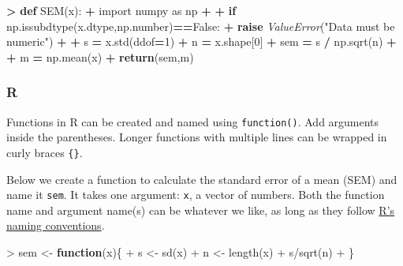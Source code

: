 \documentclass[
]{book}
\newenvironment{Shaded}{\begin{snugshade}}{\end{snugshade}}
\newcommand{\ControlFlowTok}[1]{\textcolor[rgb]{0.13,0.29,0.53}{\textbf{#1}}}
\newcommand{\DecValTok}[1]{\textcolor[rgb]{0.00,0.00,0.81}{#1}}
\newcommand{\FunctionTok}[1]{\textcolor[rgb]{0.00,0.00,0.00}{#1}}
\newcommand{\ImportTok}[1]{#1}
\newcommand{\KeywordTok}[1]{\textcolor[rgb]{0.13,0.29,0.53}{\textbf{#1}}}
\newcommand{\NormalTok}[1]{#1}
\newcommand{\OperatorTok}[1]{\textcolor[rgb]{0.81,0.36,0.00}{\textbf{#1}}}
\newcommand{\OtherTok}[1]{\textcolor[rgb]{0.56,0.35,0.01}{#1}}
\newcommand{\PreprocessorTok}[1]{\textcolor[rgb]{0.56,0.35,0.01}{\textit{#1}}}
\newcommand{\SpecialCharTok}[1]{\textcolor[rgb]{0.00,0.00,0.00}{#1}}
\newcommand{\StringTok}[1]{\textcolor[rgb]{0.31,0.60,0.02}{#1}}
\newcommand{\VariableTok}[1]{\textcolor[rgb]{0.00,0.00,0.00}{#1}}
\begin{document}
\begin{Shaded}
\begin{Highlighting}[]
\OperatorTok{\textgreater{}} \KeywordTok{def}\NormalTok{ SEM(x):}
\OperatorTok{+}   \ImportTok{import}\NormalTok{ numpy }\ImportTok{as}\NormalTok{ np}
\OperatorTok{+}   
\OperatorTok{+}   \ControlFlowTok{if}\NormalTok{ np.issubdtype(x.dtype,np.number)}\OperatorTok{==}\VariableTok{False}\NormalTok{:}
\OperatorTok{+}     \ControlFlowTok{raise} \PreprocessorTok{ValueError}\NormalTok{(}\StringTok{"Data must be numeric"}\NormalTok{)}
\OperatorTok{+}   
\OperatorTok{+}\NormalTok{   s }\OperatorTok{=}\NormalTok{ x.std(ddof}\OperatorTok{=}\DecValTok{1}\NormalTok{) }
\OperatorTok{+}\NormalTok{   n }\OperatorTok{=}\NormalTok{ x.shape[}\DecValTok{0}\NormalTok{] }
\OperatorTok{+}\NormalTok{   sem }\OperatorTok{=}\NormalTok{ s }\OperatorTok{/}\NormalTok{ np.sqrt(n) }
\OperatorTok{+}   
\OperatorTok{+}\NormalTok{   m }\OperatorTok{=}\NormalTok{ np.mean(x)}
\OperatorTok{+}   \ControlFlowTok{return}\NormalTok{(sem,m) }
\end{Highlighting}
\end{Shaded}

\hypertarget{r-7}{%
\subsubsection*{R}\label{r-7}}

Functions in R can be created and named using \texttt{function()}. Add arguments inside the parentheses. Longer functions with multiple lines can be wrapped in curly braces \texttt{\{\}}.

Below we create a function to calculate the standard error of a mean (SEM) and name it \texttt{sem}. It takes one argument: \texttt{x}, a vector of numbers. Both the function name and argument name(s) can be whatever we like, as long as they follow \href{https://cran.r-project.org/doc/manuals/r-release/R-intro.html\#R-commands_003b-case-sensitivity-etc}{R's naming conventions}.

\begin{Shaded}
\begin{Highlighting}[]
\SpecialCharTok{\textgreater{}}\NormalTok{ sem }\OtherTok{\textless{}{-}} \ControlFlowTok{function}\NormalTok{(x)\{}
\SpecialCharTok{+}\NormalTok{   s }\OtherTok{\textless{}{-}} \FunctionTok{sd}\NormalTok{(x)}
\SpecialCharTok{+}\NormalTok{   n }\OtherTok{\textless{}{-}} \FunctionTok{length}\NormalTok{(x)}
\SpecialCharTok{+}\NormalTok{   s}\SpecialCharTok{/}\FunctionTok{sqrt}\NormalTok{(n)}
\SpecialCharTok{+}\NormalTok{ \}}
\end{Highlighting}
\end{Shaded}
\end{document}
